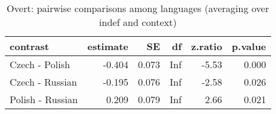 \begin{table}[!h]
\centering
\caption{Overt: pairwise comparisons among languages (averaging over indef and context)}
\centering
\begin{tabular}[t]{lrrrrr}
\toprule
contrast & estimate & SE & df & z.ratio & p.value\\
\midrule
Czech - Polish & -0.404 & 0.073 & Inf & -5.53 & 0.000\\
Czech - Russian & -0.195 & 0.076 & Inf & -2.58 & 0.026\\
Polish - Russian & 0.209 & 0.079 & Inf & 2.66 & 0.021\\
\bottomrule
\end{tabular}
\end{table}
